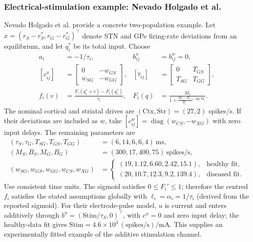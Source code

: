 ﻿\documentclass[11pt,a4paper]{article}
\begin{document}
\subsubsection*{Electrical-stimulation example: Nevado Holgado et al.}
Nevado Holgado et al.
\cite[PDF pp.~2--4, Eqs.~2--5 and Tables~1, 3]{nevado2010}
provide a concrete two-population example. Let
$x=(r_S-r_S^*,r_G-r_G^*)^\top$ denote STN and GPe firing-rate deviations
from an equilibrium, and let $q_i^*$ be its total input. Choose
\begin{equation*}
\begin{aligned}
a_i&=-1/\tau_i,& b^x_{ij}&=b^w_{ij}=0,\\
[c^x_{ij}]&=\begin{bmatrix}0&-w_{GS}\\w_{SG}&-w_{GG}\end{bmatrix},&
[\hat\tau_{ij}]&=\begin{bmatrix}0&T_{GS}\\T_{SG}&T_{GG}\end{bmatrix},\\
f_i(v)&=\frac{F_i(q_i^*+v)-F_i(q_i^*)}{\tau_i},&
F_i(q)&=\frac{M_i}{1+\frac{M_i-B_i}{B_i}e^{-4q/M_i}}.
\end{aligned}
\end{equation*}
The nominal cortical and striatal drives are
$(\mathrm{Ctx},\mathrm{Str})=(27,2)$ spikes/s. If their deviations are
included as $w$, take $[c^w_{ij}]=\operatorname{diag}(w_{CS},-w_{XG})$
with zero input delays. The remaining parameters are
\begin{equation*}
\begin{aligned}
(\tau_S,\tau_G,T_{SG},T_{GS},T_{GG})&=(6,14,6,6,4)\ \mathrm{ms},\\
(M_S,B_S,M_G,B_G)&=(300,17,400,75)\ \mathrm{spikes/s},\\
(w_{SG},w_{GS},w_{GG},w_{CS},w_{XG})
&=\begin{cases}
(19,1.12,6.60,2.42,15.1),&\text{healthy fit},\\
(20,10.7,12.3,9.2,139.4),&\text{diseased fit}.
\end{cases}
\end{aligned}
\end{equation*}
Use consistent time units. The sigmoid satisfies $0\leq F_i'\leq1$;
therefore the centred $f_i$ satisfies the stated assumptions globally
with $\ell_i=\alpha_i=1/\tau_i$ (derived from the reported sigmoid).
For their electrode-pulse model, $u$ is current and enters additively
through $b^u=(\mathrm{Stim}/\tau_S,0)^\top$, with $c^u=0$ and zero
input delay; the healthy-data fit gives
$\mathrm{Stim}=4.6\times10^3\,(\mathrm{spikes/s})/\mathrm{mA}$.
This supplies an experimentally fitted example of the additive
stimulation channel.
\end{document}

